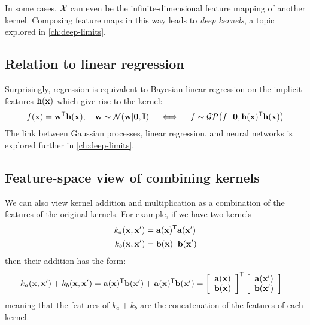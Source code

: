 In some cases, $\mathcal{X}$ can even be the infinite-dimensional feature mapping of another kernel.  Composing feature maps in this way leads to \emph{deep kernels}, a topic explored in \cref{ch:deep-limits}.



\subsection{Relation to linear regression}

Surprisingly, \gp{} regression is equivalent to Bayesian linear regression on the implicit features ${\bf{h}}({\bf{x}})$ which give rise to the kernel:
%
\begin{align}
f({\bf{x}}) = {\bf{w}}^{\mathsf{T}} {\bf{h}}({\bf{x}}), \quad {\bf{w}} \sim \mathcal{N}\!\left({\bf{w}} \middle| {\bf{0}},\mathbf{I}\right) \quad
\iff
\quad f \sim \mathcal{GP}\!\left(f \, \middle| \, {\bf{0}}, {\bf{h}}({\bf{x}}) ^{\mathsf{T}} {\bf{h}}({\bf{x}}) \right)
\end{align}
%
The link between Gaussian processes, linear regression, and neural networks is explored further in \cref{ch:deep-limits}.


\subsection{Feature-space view of combining kernels}

\def\feata{\va}
\def\featb{\vb}



We can also view kernel addition and multiplication as a combination of the features of the original kernels.
For example, if we have two kernels
%
\begin{align}
k_a(\iva, \iva') & = \feata(\iva)\tra \feata(\iva')\\
k_b(\iva, \iva') & = \featb(\iva)\tra \featb(\iva')
\end{align}
%
then their addition has the form:
%
\begin{align}
k_a(\iva, \iva') + k_b(\iva, \iva')
& = \feata(\iva)\tra \featb(\iva') + \feata(\iva)\tra \featb(\iva') 
 = \colvec{\feata(\iva)}{\featb(\iva)}\tra \colvec{\feata(\iva')}{\featb(\iva')}
\end{align}
%
meaning that the features of $k_a + k_b$ are the concatenation of the features of each kernel.

